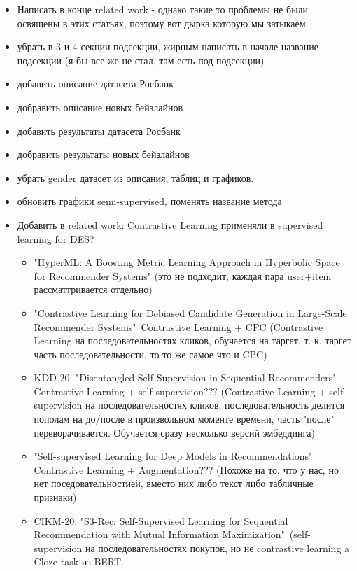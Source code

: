 \documentclass{article}
\begin{document}
\begin{itemize}
\item Написать в конце related work - однако такие то проблемы не были освящены в этих статьях, поэтому вот дырка которую мы затыкаем

\item убрать в 3 и 4 
секции подсекции, жирным написать в начале название подсекции (я бы все же не стал, там есть под-подсекции)

\item добавить описание датасета Росбанк

\item добравить описание новых бейзлайнов

\item добавить результаты датасета Росбанк

\item добравить результаты новых бейзлайнов

\item убрать gender датасет из описания, таблиц и графиков.

\item обновить графики semi-supervised, поменять название метода

\item Добавить в related work: Contrastive Learning применяли в supervised learning for DES?
\begin{itemize}
\item "HyperML: A Boosting Metric Learning Approach in Hyperbolic Space for Recommender Systems" (это не подходит, каждая пара user+item рассматтривается отдельно)
\item "Contrastive Learning for Debiased Candidate Generation in Large-Scale Recommender Systems"\ Contrastive Learning + CPC (Contrastive Learning на последовательностях кликов, обучается на таргет, т. к. таргет часть последовательности, то то же самое что и CPC)
\item KDD-20: "Disentangled Self-Supervision in Sequential Recommenders" Contrastive Learning + self-supervision??? (Contrastive Learning + self-supervision на последовательностях кликов, последовательность делится пополам на до/после в произвольном моменте времени, часть "после" переворачивается. Обучается сразу несколько версий эмбеддинга)
\item "Self-supervised Learning for Deep Models in Recommendations" Contrastive Learning + Augmentation??? (Похоже на то, что у нас, но нет поседовательностией, вместо них либо текст либо табличные признаки)
\item CIKM-20: "S3-Rec: Self-Supervised Learning for Sequential Recommendation with Mutual Information Maximization"\ (self-supervision на последовательностях покупок, но не contrastive learning a  Cloze task из BERT.
\end{itemize}

\end{itemize}
\end{document}
